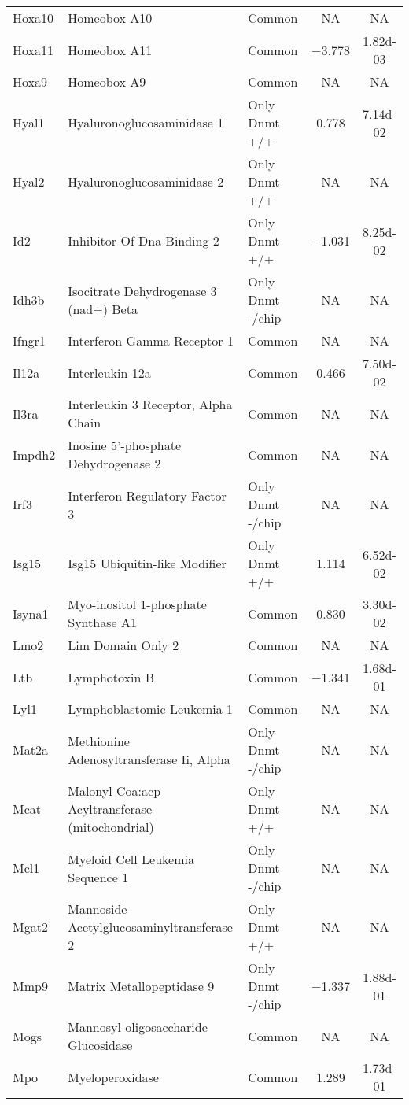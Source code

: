 {\begin{longtable}[l]{>{\raggedright}p{2.5cm}>{\raggedright}p{6cm}lcc}
Hoxa10	& Homeobox A10	& Common	& NA	& NA\\ 
Hoxa11	& Homeobox A11	& Common	& \num{-3.778}	& \num{1.82d-03}\\ 
Hoxa9	& Homeobox A9	& Common	& NA	& NA\\ 
Hyal1	& Hyaluronoglucosaminidase 1	& Only Dnmt +/+	& \num{ 0.778}	& \num{7.14d-02}\\ 
Hyal2	& Hyaluronoglucosaminidase 2	& Only Dnmt +/+	& NA	& NA\\ 
Id2	& Inhibitor Of Dna Binding 2	& Only Dnmt +/+	& \num{-1.031}	& \num{8.25d-02}\\ 
Idh3b	& Isocitrate Dehydrogenase 3 (nad+) Beta	& Only Dnmt -/chip	& NA	& NA\\ 
Ifngr1	& Interferon Gamma Receptor 1	& Common	& NA	& NA\\ 
Il12a	& Interleukin 12a	& Common	& \num{ 0.466}	& \num{7.50d-02}\\ 
Il3ra	& Interleukin 3 Receptor, Alpha Chain	& Common	& NA	& NA\\ 
Impdh2	& Inosine 5'-phosphate Dehydrogenase 2	& Common	& NA	& NA\\ 
Irf3	& Interferon Regulatory Factor 3	& Only Dnmt -/chip	& NA	& NA\\ 
Isg15	& Isg15 Ubiquitin-like Modifier	& Only Dnmt +/+	& \num{ 1.114}	& \num{6.52d-02}\\ 
Isyna1	& Myo-inositol 1-phosphate Synthase A1	& Common	& \num{ 0.830}	& \num{3.30d-02}\\ 
Lmo2	& Lim Domain Only 2	& Common	& NA	& NA\\ 
Ltb	& Lymphotoxin B	& Common	& \num{-1.341}	& \num{1.68d-01}\\ 
Lyl1	& Lymphoblastomic Leukemia 1	& Common	& NA	& NA\\ 
Mat2a	& Methionine Adenosyltransferase Ii, Alpha	& Only Dnmt -/chip	& NA	& NA\\ 
Mcat	& Malonyl Coa:acp Acyltransferase (mitochondrial)	& Only Dnmt +/+	& NA	& NA\\ 
Mcl1	& Myeloid Cell Leukemia Sequence 1	& Only Dnmt -/chip	& NA	& NA\\ 
Mgat2	& Mannoside Acetylglucosaminyltransferase 2	& Only Dnmt +/+	& NA	& NA\\ 
Mmp9	& Matrix Metallopeptidase 9	& Only Dnmt -/chip	& \num{-1.337}	& \num{1.88d-01}\\ 
Mogs	& Mannosyl-oligosaccharide Glucosidase	& Common	& NA	& NA\\ 
Mpo	& Myeloperoxidase	& Common	& \num{ 1.289}	& \num{1.73d-01}\\ 

\end{longtable}}
